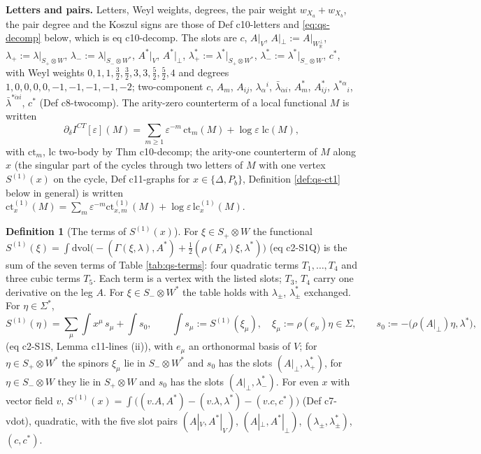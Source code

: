 \documentclass[11pt]{article}
\numberwithin{equation}{section}
\theoremstyle{plain}
\theoremstyle{definition}
\newtheorem{definition}[theorem]{Definition}
\newcommand{\Ap}{A|_{\perp}}
\newcommand{\AV}{A|_V}
\begin{document}
\textbf{Letters and pairs.} Letters, Weyl weights, degrees, the pair weight $w_{X_a}+w_{X_b}$, the pair degree and the Koszul signs are those of Def c10-letters and \eqref{eq:qs-decomp} below, which is eq c10-decomp. The slots are $c$, $\AV$, $\Ap:=A|_{W_{\mathbb R}^\perp}$, $\lambda_+:=\lambda|_{S_+\otimes W}$, $\lambda_-:=\lambda|_{S_-\otimes W^*}$, $A^*|_V$, $A^*|_\perp$, $\lambda^*_+:=\lambda^*|_{S_+\otimes W^*}$, $\lambda^*_-:=\lambda^*|_{S_-\otimes W}$, $c^*$, with Weyl weights $0,1,1,\tfrac32,\tfrac32,3,3,\tfrac52,\tfrac52,4$ and degrees $1,0,0,0,0,-1,-1,-1,-1,-2$; two-component $c$, $A_m$, $A_{ij}$, $\lambda_\alpha{}^i$, $\bar\lambda_{\dot\alpha i}$, $A^*_m$, $A^*_{ij}$, $\lambda^{*\alpha}{}_i$, $\bar\lambda^{*\dot\alpha i}$, $c^*$ (Def c8-twocomp). The arity-zero counterterm of a local functional $M$ is written
\[
\partial_\delta I^{CT}[\varepsilon](M)=\sum_{m\ge1}\varepsilon^{-m}\,\mathrm{ct}_m(M)+\log\varepsilon\;\mathrm{lc}(M),
\]
with $\mathrm{ct}_m$, $\mathrm{lc}$ two-body by Thm c10-decomp; the arity-one counterterm of $M$ along $x$ (the singular part of the cycles through two letters of $M$ with one vertex $S^{(1)}(x)$ on the cycle, Def c11-graphs for $x\in\{\Delta,P_b\}$, Definition \ref{def:qs-ct1} below in general) is written $\mathrm{ct}^{(1)}_x(M)=\sum_m\varepsilon^{-m}\mathrm{ct}^{(1)}_{x,m}(M)+\log\varepsilon\,\mathrm{lc}^{(1)}_x(M)$.

\begin{definition}[The terms of $S^{(1)}(x)$]
\label{def:qs-terms}
For $\xi\in S_+\otimes W$ the functional $S^{(1)}(\xi)=\int\mathrm{dvol}\big(-(\Gamma(\xi,\lambda),A^*)+\tfrac12(\rho(F_A)\xi,\lambda^*)\big)$ (eq c2-S1Q) is the sum of the seven terms of Table \ref{tab:qs-terms}: four quadratic terms $T_1,\dots,T_4$ and three cubic terms $T_5$. Each term is a vertex with the listed slots; $T_3$, $T_4$ carry one derivative on the leg $A$. For $\xi\in S_-\otimes W^*$ the table holds with $\lambda_\pm$, $\lambda^*_\pm$ exchanged. For $\eta\in\Sigma^*$,
\begin{equation}
S^{(1)}(\eta)=\sum_\mu\int x^\mu\,s_\mu+\int s_0,\qquad \int s_\mu:=S^{(1)}(\xi_\mu),\quad \xi_\mu:=\rho(e_\mu)\eta\in\Sigma,\qquad s_0:=-\big(\rho(A|_\perp)\eta,\lambda^*\big),
\label{eq:qs-Seta}
\end{equation}
(eq c2-S1S, Lemma c11-lines (ii)), with $e_\mu$ an orthonormal basis of $V$; for $\eta\in S_+\otimes W^*$ the spinors $\xi_\mu$ lie in $S_-\otimes W^*$ and $s_0$ has the slots $(\Ap,\lambda^*_+)$, for $\eta\in S_-\otimes W$ they lie in $S_+\otimes W$ and $s_0$ has the slots $(\Ap,\lambda^*_-)$. For even $x$ with vector field $v$, $S^{(1)}(x)=\int\big((v.A,A^*)-(v.\lambda,\lambda^*)-(v.c,c^*)\big)$ (Def c7-vdot), quadratic, with the five slot pairs $(\AV,A^*|_V)$, $(\Ap,A^*|_\perp)$, $(\lambda_\pm,\lambda^*_\pm)$, $(c,c^*)$.
\end{definition}
\end{document}
